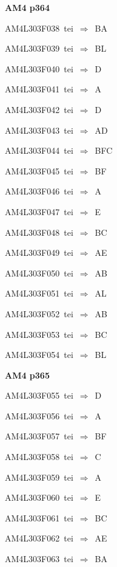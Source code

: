 \par\vfill\eject
{\bf\hfill AM4 p364\hfill\hbox{}}\par\bigskip
{\sixrm AM4L303F038\ {\sixit tei}\ }$\Rightarrow$\ BA\par\smallskip
{\sixrm AM4L303F039\ {\sixit tei}\ }$\Rightarrow$\ BL\par\smallskip
{\sixrm AM4L303F040\ {\sixit tei}\ }$\Rightarrow$\ D\par\smallskip
{\sixrm AM4L303F041\ {\sixit tei}\ }$\Rightarrow$\ A\par\smallskip
{\sixrm AM4L303F042\ {\sixit tei}\ }$\Rightarrow$\ D\par\smallskip
{\sixrm AM4L303F043\ {\sixit tei}\ }$\Rightarrow$\ AD\par\smallskip
{\sixrm AM4L303F044\ {\sixit tei}\ }$\Rightarrow$\ BFC\par\smallskip
{\sixrm AM4L303F045\ {\sixit tei}\ }$\Rightarrow$\ BF\par\smallskip
{\sixrm AM4L303F046\ {\sixit tei}\ }$\Rightarrow$\ A\par\smallskip
{\sixrm AM4L303F047\ {\sixit tei}\ }$\Rightarrow$\ E\par\smallskip
{\sixrm AM4L303F048\ {\sixit tei}\ }$\Rightarrow$\ BC\par\smallskip
{\sixrm AM4L303F049\ {\sixit tei}\ }$\Rightarrow$\ AE\par\smallskip
{\sixrm AM4L303F050\ {\sixit tei}\ }$\Rightarrow$\ AB\par\smallskip
{\sixrm AM4L303F051\ {\sixit tei}\ }$\Rightarrow$\ AL\par\smallskip
{\sixrm AM4L303F052\ {\sixit tei}\ }$\Rightarrow$\ AB\par\smallskip
{\sixrm AM4L303F053\ {\sixit tei}\ }$\Rightarrow$\ BC\par\smallskip
{\sixrm AM4L303F054\ {\sixit tei}\ }$\Rightarrow$\ BL\par\smallskip

\par\vfill\eject
{\bf\hfill AM4 p365\hfill\hbox{}}\par\bigskip
{\sixrm AM4L303F055\ {\sixit tei}\ }$\Rightarrow$\ D\par\smallskip
{\sixrm AM4L303F056\ {\sixit tei}\ }$\Rightarrow$\ A\par\smallskip
{\sixrm AM4L303F057\ {\sixit tei}\ }$\Rightarrow$\ BF\par\smallskip
{\sixrm AM4L303F058\ {\sixit tei}\ }$\Rightarrow$\ C\par\smallskip
{\sixrm AM4L303F059\ {\sixit tei}\ }$\Rightarrow$\ A\par\smallskip
{\sixrm AM4L303F060\ {\sixit tei}\ }$\Rightarrow$\ E\par\smallskip
{\sixrm AM4L303F061\ {\sixit tei}\ }$\Rightarrow$\ BC\par\smallskip
{\sixrm AM4L303F062\ {\sixit tei}\ }$\Rightarrow$\ AE\par\smallskip
{\sixrm AM4L303F063\ {\sixit tei}\ }$\Rightarrow$\ BA\par\smallskip


